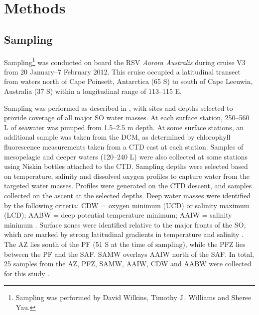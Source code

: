 \section{Methods}

\subsection{Sampling}


Sampling\footnote{Sampling was performed by David Wilkins, Timothy J.\ Williams and Sheree Yau.} was conducted on board the RSV \textit{Aurora Australis} during cruise V3 from 20 January--7 February 2012.
This cruise occupied a latitudinal transect from waters north of Cape Poinsett, Antarctica (65\textdegree{} S) to south of Cape Leeuwin, Australia (37\textdegree{} S) within a longitudinal range of 113--115\textdegree{} E.

Sampling was performed as described in , with sites and depths selected to provide coverage of all major \ac{SO} water masses.
At each surface station, \textapprox{}250--560 L of seawater was pumped from \textapprox{}1.5--2.5 m depth.
At some surface stations, an additional sample was taken from the \ac{DCM}, as determined by chlorophyll fluorescence measurements taken from a \ac{CTD} cast at each station.
Samples of mesopelagic and deeper waters (\textapprox{}120--240 L) were also collected at some stations using Niskin bottles attached to the \ac{CTD}.
Sampling depths were selected based on temperature, salinity and dissolved oxygen profiles to capture water from the targeted water masses.
Profiles were generated on the \ac{CTD} descent, and samples collected on the ascent at the selected depths.
Deep water masses were identified by the following criteria: \ac{CDW} = oxygen minimum (\ac{UCD}) or salinity maximum (\ac{LCD}); \ac{AABW} = deep potential temperature minimum; \ac{AAIW} = salinity minimum \cite{Foldvik:1988gp}.
Surface zones were identified relative to the major fronts of the \ac{SO}, which are marked by strong latitudinal gradients in temperature and salinity \cite{Sokolov:2002tc, Orsi:1995va}.
The \ac{AZ} lies south of the \ac{PF} (\textapprox{}51\textdegree{} S at the time of sampling), while the \ac{PFZ} lies between the \ac{PF} and the \ac{SAF}.
\ac{SAMW} overlays \ac{AAIW} north of the \ac{SAF}.
In total, 25 samples from the \ac{AZ}, \ac{PFZ}, \ac{SAMW}, \ac{AAIW}, \ac{CDW} and \ac{AABW} were collected for this study .

